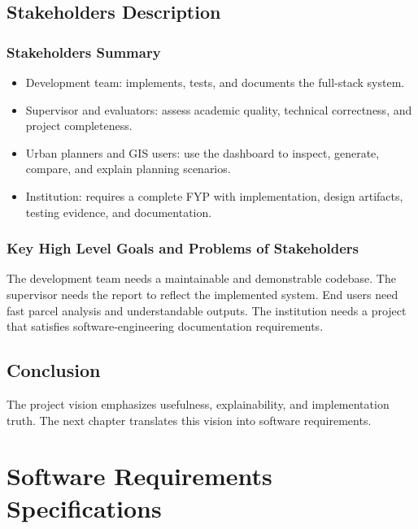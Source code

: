 \documentclass[12pt,a4paper,oneside]{report}
\begin{document}
\section{Stakeholders Description}
\subsection{Stakeholders Summary}
\begin{itemize}
  \item Development team: implements, tests, and documents the full-stack system.
  \item Supervisor and evaluators: assess academic quality, technical correctness, and project completeness.
  \item Urban planners and GIS users: use the dashboard to inspect, generate, compare, and explain planning scenarios.
  \item Institution: requires a complete FYP with implementation, design artifacts, testing evidence, and documentation.
\end{itemize}

\subsection{Key High Level Goals and Problems of Stakeholders}
The development team needs a maintainable and demonstrable codebase. The supervisor needs the report to reflect the implemented system. End users need fast parcel analysis and understandable outputs. The institution needs a project that satisfies software-engineering documentation requirements.

\section{Conclusion}
The project vision emphasizes usefulness, explainability, and implementation truth. The next chapter translates this vision into software requirements.

\chapter{Software Requirements Specifications}
\end{document}
